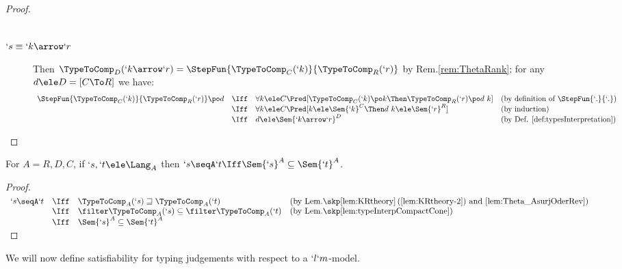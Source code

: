 \documentclass{lmcs}
\begin{document}
\begin{proof}
\begin{description}
\[\begin{array}{lcll}
 \end{array} \] 
	
 \item [$ `s \equiv `k\arrow `r $] 
Then $\TypeToComp_D(`k\arrow `r) = \StepFun{\TypeToComp_C(`k)}{\TypeToComp_R(`r)}$ by Rem.\skp\ref{rem:ThetaRank}; for any $d \ele D = [C\To R]$ we have: 
%
 \[ \begin{array}{lcll}
\StepFun{\TypeToComp_C(`k)}{\TypeToComp_R(`r)} \po d 
	& \Iff &
\forall k \ele C \Pred[ \TypeToComp_C(`k) \po k \Then \TypeToComp_R(`r) \po d \ k ]
		& (\textrm{by definition of } \StepFun{`.}{`.} ) \\ %
	& \Iff & 
\forall k \ele C \Pred[ k \ele \Sem{`k}^C \Then d \ k \ele \Sem{`r}^R ]
		& (\textrm{by induction}) \\
	& \Iff & 
d \ele \Sem{ `k\arrow `r}^D 
	& (\textrm{by Def. \ref{def:typesInterpretation}}) 
 \end{array} \]
\arrayqed[-22pt] %
 \end{description}
 \end{proof}



 \begin{cor} \label{cor:leq} 
For $A = R,D,C$, if $`s, `t \ele \Lang_A$ then $`s \seqA `t \Iff \Sem{ `s }^A \subseteq \Sem{ `t }^A$.
 \end{cor}

 \begin{proof}
 $ \begin{array}[t]{rcl@{\quad}l}
`s \seqA `t 
	& \Iff & 
\TypeToComp_A(`s) \sqsupseteq \TypeToComp_A(`t) 
	& (\textrm{by Lem.\skp\ref{lem:KRtheory}\,(\ref{lem:KRtheory-2}) and 
	\ref{lem:Theta_AsurjOderRev}}) \\ %
	& \Iff & 
\filter \TypeToComp_A(`s) \subseteq \filter \TypeToComp_A(`t) 
	& (\textrm{by Lem.\skp\ref{lem:typeInterpCompactCone}}) \\ %
	& \Iff & 
\Sem{ `s }^A \subseteq \Sem{ `t }^A 
 \end{array} $ 
\arrayqed 
 \end{proof}

We will now define satisfiability for typing judgements with respect to a $`l`m$-model.
\end{document}
